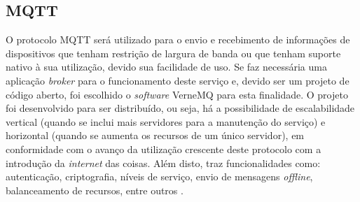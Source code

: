     	\begin{figure}[!h]
    	\end{figure}
        
        \subsection{MQTT}
        \label{sec:aquisicao-mqtt}
        O protocolo \gls{MQTT} será utilizado para o envio e recebimento de informações de dispositivos que tenham restrição de largura de banda ou que tenham suporte nativo à sua utilização, devido sua facilidade de uso. Se faz necessária uma aplicação \textit{broker} para o funcionamento deste serviço e, devido ser um projeto de código aberto, foi escolhido o \textit{software} VerneMQ para esta finalidade. O projeto foi desenvolvido para ser distribuído, ou seja, há a possibilidade de escalabilidade vertical (quando se inclui mais servidores para a manutenção do serviço) e horizontal (quando se aumenta os recursos de um único servidor), em conformidade com o avanço da utilização crescente deste protocolo com a introdução da \textit{internet} das coisas. Além disto, traz funcionalidades como: autenticação, criptografia, níveis de serviço, envio de mensagens \textit{offline}, balanceamento de recursos, entre outros \cite{VerneMQ}.
        
        \begin{figure}[!h]
    	\end{figure}
    	
